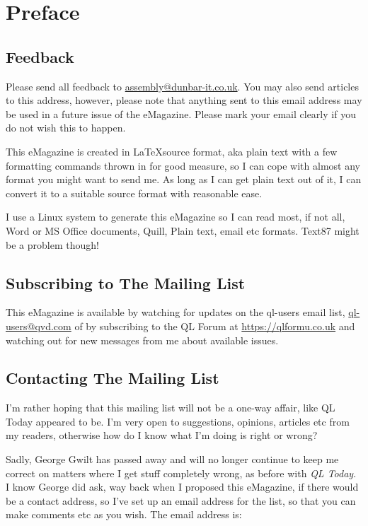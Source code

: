 \chapter{Preface}
\section{Feedback}
Please send all feedback to \url{assembly@dunbar-it.co.uk}. You may also send articles to
this address, however, please note that anything sent to this email address may be used in a future issue of the eMagazine. Please mark your email clearly if you do not wish this to happen.

This eMagazine is created in \LaTeX  source format, aka plain text with a few formatting commands thrown in for good measure, so I can cope with almost any format you might want to send me. As long as I can get plain text out of it, I can convert it to a suitable source format with reasonable ease. 

I use a Linux system to generate this eMagazine so I can read most, if not all, Word or MS Office documents, Quill, Plain text, email etc formats. Text87 might be a problem though!

\section{Subscribing to The Mailing List}
This eMagazine is available by watching for updates on the ql-users email list, \url{ql-users@qvd.com} of by subscribing to the QL Forum at \url{https://qlformu.co.uk} and watching out for new messages from me about available issues.

\section{Contacting The Mailing List}
I'm rather hoping that this mailing list will not be a one-way affair, like QL Today appeared to be. I'm very open to suggestions, opinions, articles etc from my readers, otherwise how do I know what I'm doing is right or wrong?

Sadly, George Gwilt has passed away and will no longer continue to keep me correct on matters where I get stuff completely wrong, as before with \emph{QL Today}. I know George did ask, way back when I proposed this eMagazine, if there would be a contact address, so I've set up an email address for the list, so that you can make comments etc as you wish. The email address is:

